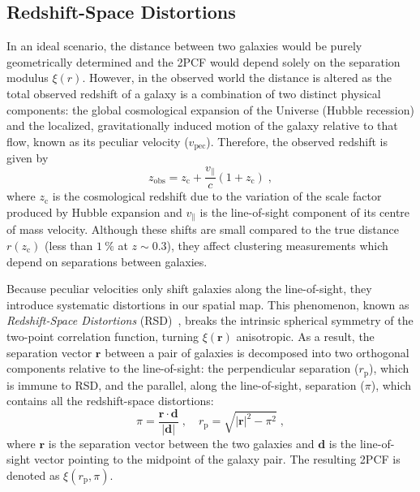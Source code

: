 \documentclass[12pt,a4paper,oneside]{report}
\begin{document}
\subsection{Redshift-Space Distortions}\label{subsec:RedshiftSpaceDistortions}
In an ideal scenario, the distance between two galaxies would be purely geometrically determined and the 2PCF would depend solely on the separation modulus $\xi (r)$. However, in the observed world the distance is altered as the total observed redshift of a galaxy is a combination of two distinct physical components: the global cosmological expansion of the Universe (Hubble recession) and the localized, gravitationally induced motion of the galaxy relative to that flow, known as its peculiar velocity ($v_{\mathrm{pec}}$). Therefore, the observed redshift is given by
\begin{equation}
  z_\mathrm{obs} = z_\mathrm{c} + \frac{v_\parallel}{c} (1 + z_\mathrm{c}) \; ,
  \label{eq:z_obs}
\end{equation}
where $z_\mathrm{c}$ is the cosmological redshift due to the variation of the scale factor produced by Hubble expansion and $v_\parallel$ is the line-of-sight component of its centre of mass velocity. Although these shifts are small compared to the true distance $r(z_\mathrm{c})$ (less than $\SI{1}{\percent}$ at $z \sim 0.3$), they affect clustering measurements which depend on separations between galaxies.

Because peculiar velocities only shift galaxies along the line-of-sight, they introduce systematic distortions in our spatial map. This phenomenon, known as \textit{Redshift-Space Distortions} (RSD)~\cite{Kazin1987}, breaks the intrinsic spherical symmetry of the two-point correlation function, turning $\xi(\mathbf{r})$ anisotropic. As a result, the separation vector $\mathbf{r}$ between a pair of galaxies is decomposed into two orthogonal components relative to the line-of-sight: the perpendicular separation ($r_\mathrm{p}$), which is immune to RSD, and the parallel, along the line-of-sight, separation ($\pi$), which contains all the redshift-space distortions:
\begin{equation}
  \pi = \frac{\mathbf{r} \cdot \mathbf{d}}{|\mathbf{d}|} \; , \quad r_\mathrm{p} = \sqrt{|\mathbf{r}|^2 - \pi^2} \; ,
  \label{eq:rp_pi}
\end{equation}
where $\mathbf{r}$ is the separation vector between the two galaxies and $\mathbf{d}$ is the line-of-sight vector pointing to the midpoint of the galaxy pair. The resulting 2PCF is denoted as $\xi(r_\mathrm{p}, \pi)$.
\end{document}
